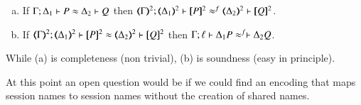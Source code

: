 \begin{conjecture}\rm
	\begin{enumerate}[a)]
		\item
			If
			$\Gamma; \Delta_1 \vdash P \approx \Delta_2 \vdash Q$
			then
			$\horel{\mapt{\Gamma}^{2}}{\mapt{\Delta_1}^{2}}{\map{P}^{2}}{\wbf}{\mapt{\Delta_2}^{2}}
			{\map{Q}^{2}}$.
		\item  
			If 
			$\horel{\mapt{\Gamma}^{2}}{\mapt{\Delta_1}^{2}}{\map{P}^{2}}{\wb}{\mapt{\Delta_2}^{2}}
			{\map{Q}^{2}}$
			then 
			$\Gamma; \ell \vdash \Delta_1  P  \approx^{f} \vdash  \Delta_2{Q}$.
	\end{enumerate}
	While (a) is  completeness (non trivial), (b) is soundness  (easy in principle).
\end{conjecture}

At this point an open  question would be if we could find an encoding that maps
session names to session names without the creation of shared names.


